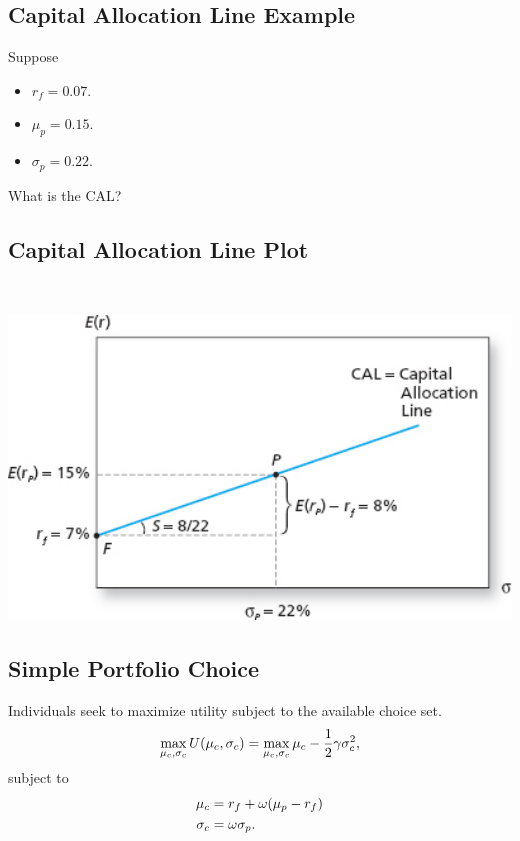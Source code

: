 \documentclass[letterpaper,10pt,english]{sphinxmanual}
\begin{document}
\subsection{Capital Allocation Line Example}
\label{allocation:capital-allocation-line-example}
Suppose
\begin{itemize}
\item {} 
$r_f = 0.07$.

\end{itemize}
\begin{itemize}
\item {} 
$\mu_p = 0.15$.

\end{itemize}
\begin{itemize}
\item {} 
$\sigma_p = 0.22$.

\end{itemize}

What is the CAL?


\subsection{Capital Allocation Line Plot}
\label{allocation:capital-allocation-line-plot}
$\qquad$

\includegraphics[width=6in]{pg172_1.jpg}


\subsection{Simple Portfolio Choice}
\label{allocation:simple-portfolio-choice}
Individuals seek to maximize utility subject to the available choice
set.
\begin{gather}
\begin{split}\max_{\mu_c, \sigma_c} U(\mu_c, \sigma_c) = \max_{\mu_c, \sigma_c}
\mu_c - \frac{1}{2} \gamma \sigma^2_c,\end{split}\notag
\end{gather}
subject to
\begin{gather}
\begin{split}\mu_c & = r_f + \omega (\mu_p - r_f) \\
\sigma_c & = \omega \sigma_p.\end{split}\notag
\end{gather}
\end{document}
